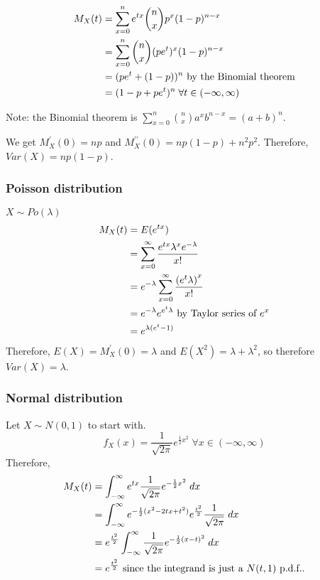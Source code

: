 \documentclass[12pt]{article}
\begin{document}
\begin{align*}
   M_X (t) &= \sum_{x=0}^{n} e^{tx} {n \choose x} p^x(1-p)^{n-x} \\
   &= \sum_{x=0}^{n} {n \choose x} (pe^t)^x(1-p)^{n-x} \\
   &= (pe^t + (1 - p))^n \textnormal{ by the Binomial theorem} \\
   &= (1 - p + pe^t)^n \; \forall t \in (-\infty, \infty)
\end{align*}

Note: the Binomial theorem is $\sum_{x=0}^{n} {n \choose x} a^x b^{n-x} = (a+b)^n$.

We get $M_X^{\prime} (0) = np$ and $M_X^{\prime \prime} (0) = np(1-p) + n^2 p^2$. Therefore, $Var(X) = np(1-p)$.

\subsubsection{Poisson distribution}
$X \sim Po(\lambda)$
\begin{align*}
    M_X (t) &= E(e^{tx}) \\
        &= \sum_{x=0}^{\infty} \frac{e^{tx} \lambda^x e^{-\lambda}}{x!} \\
        &= e^{-\lambda} \sum_{x=0}^{\infty} \frac{ {(e^{t}\lambda)}^x}{x!} \\
        &= e^{-\lambda} e^{e^t \lambda} \textnormal{ by Taylor series of } e^x \\
        &= e^{\lambda (e^t - 1)}
\end{align*}
Therefore, $E(X) = M_X^{\prime} (0) = \lambda$ and $E(X^2) = \lambda + \lambda^2$, so therefore $Var(X) = \lambda$.

\subsubsection{Normal distribution}
Let $X \sim N(0,1)$ to start with. 
\[
    f_X (x) = \frac{1}{\sqrt{2 \pi}} e^{\frac{1}{2} x^2} \; \forall x \in (-\infty, \infty)
\]
Therefore,
\begin{align*}
    M_X (t) &= \int_{-\infty}^{\infty} e^{tx} \frac{1}{\sqrt{2 \pi}} e^{-\frac{1}{2} x^2} \; dx \\
        &= \int_{-\infty}^{\infty} e^{-\frac{1}{2} (x^2 - 2tx + t^2)} e^{\frac{t^2}{2}} \frac{1}{\sqrt{2\pi}} \; dx \\
        &= e^{\frac{t^2}{2}} \int_{-\infty}^{\infty} \frac{1}{\sqrt{2\pi}} e^{-\frac{1}{2} (x-t)^2} \; dx \\
        &= e^{\frac{t^2}{2}} \textnormal{ since the integrand is just a $N(t,1)$ p.d.f..}
\end{align*}
\end{document}
